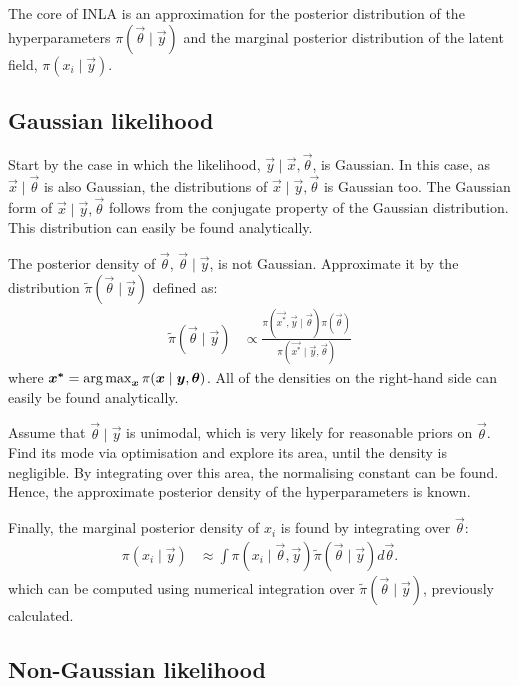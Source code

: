 \documentclass[thesis.tex]{subfiles}
\begin{document}
The core of INLA is an approximation for the posterior distribution of the hyperparameters $\pi(\vec{\theta} \mid \vec{y})$ and the marginal posterior distribution of the latent field, $\pi(x_i \mid \vec{y})$.

\subsection{Gaussian likelihood}

Start by the case in which the likelihood, $\vec{y} \mid \vec{x}, \vec{\theta}$, is Gaussian.
In this case, as $\vec{x} \mid \vec{\theta}$ is also Gaussian, the distributions of $\vec{x} \mid \vec{y}, \vec{\theta}$ is Gaussian too.
The Gaussian form of $\vec{x} \mid \vec{y}, \vec{\theta}$ follows from the conjugate property of the Gaussian distribution.
This distribution can easily be found analytically.

The posterior density of $\vec{\theta}$, $\vec{\theta }\mid \vec{y}$, is not Gaussian.
Approximate it by the distribution $\tilde\pi(\vec{\theta} \mid \vec{y})$ defined as:
\begin{align}
\tilde\pi(\vec{\theta} \mid \vec{y})
&\propto \frac{\pi(\vec{x^*}, \vec{y} \mid \vec{\theta}) \pi(\vec{\theta})}{\pi(\vec{x^*} \mid \vec{y}, \vec{\theta})}
\end{align}
where $\bm{x^*} = \operatorname*{arg\,max}_{\bm{x}} \pi(\bm{x} \mid \bm{y}, \bm{\theta})$.
All of the densities on the right-hand side can easily be found analytically.

Assume that $\vec{\theta} \mid \vec{y}$ is unimodal, which is very likely for reasonable priors on $\vec{\theta}$.
Find its mode via optimisation and explore its area, until the density is negligible.
By integrating over this area, the normalising constant can be found.
Hence, the approximate posterior density of the hyperparameters is known.

Finally, the marginal posterior density of $x_i$ is found by integrating over $\vec{\theta}$:
\begin{align}
\pi(x_i \mid \vec{y})
&\approx \int \pi(x_i \mid \vec{\theta}, \vec{y}) \tilde\pi(\vec{\theta} \mid \vec{y}) d\vec{\theta}.
\end{align}
which can be computed using numerical integration over $\tilde\pi(\vec{\theta} \mid \vec{y})$, previously calculated.

\subsection{Non-Gaussian likelihood}
\end{document}
